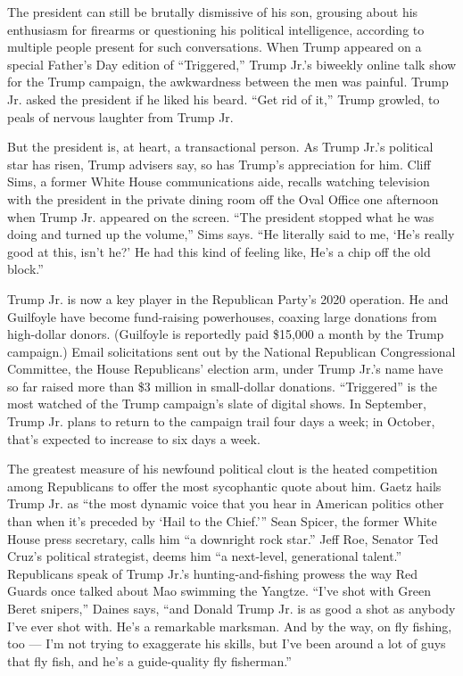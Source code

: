 The president can still be brutally dismissive of his son, grousing
about his enthusiasm for firearms or questioning his political
intelligence, according to multiple people present for such
conversations. When Trump appeared on a special Father's Day edition of
``Triggered,'' Trump Jr.'s biweekly online talk show for the Trump
campaign, the awkwardness between the men was painful. Trump Jr. asked
the president if he liked his beard. ``Get rid of it,'' Trump growled,
to peals of nervous laughter from Trump Jr.

But the president is, at heart, a transactional person. As Trump Jr.'s
political star has risen, Trump advisers say, so has Trump's
appreciation for him. Cliff Sims, a former White House communications
aide, recalls watching television with the president in the private
dining room off the Oval Office one afternoon when Trump Jr. appeared on
the screen. ``The president stopped what he was doing and turned up the
volume,'' Sims says. ``He literally said to me, `He's really good at
this, isn't he?' He had this kind of feeling like, He's a chip off the
old block.''

Trump Jr. is now a key player in the Republican Party's 2020 operation.
He and Guilfoyle have become fund-raising powerhouses, coaxing large
donations from high-dollar donors. (Guilfoyle is reportedly paid
\$15,000 a month by the Trump campaign.) Email solicitations sent out by
the National Republican Congressional Committee, the House Republicans'
election arm, under Trump Jr.'s name have so far raised more than \$3
million in small-dollar donations. ``Triggered'' is the most watched of
the Trump campaign's slate of digital shows. In September, Trump Jr.
plans to return to the campaign trail four days a week; in October,
that's expected to increase to six days a week.

The greatest measure of his newfound political clout is the heated
competition among Republicans to offer the most sycophantic quote about
him. Gaetz hails Trump Jr. as ``the most dynamic voice that you hear in
American politics other than when it's preceded by `Hail to the
Chief.''' Sean Spicer, the former White House press secretary, calls him
``a downright rock star.'' Jeff Roe, Senator Ted Cruz's political
strategist, deems him ``a next-level, generational talent.'' Republicans
speak of Trump Jr.'s hunting-and-fishing prowess the way Red Guards once
talked about Mao swimming the Yangtze. ``I've shot with Green Beret
snipers,'' Daines says, ``and Donald Trump Jr. is as good a shot as
anybody I've ever shot with. He's a remarkable marksman. And by the way,
on fly fishing, too --- I'm not trying to exaggerate his skills, but
I've been around a lot of guys that fly fish, and he's a guide-quality
fly fisherman.''

